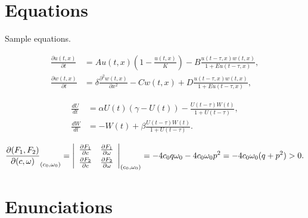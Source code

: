 \documentclass[preprint]{ptephy_v1}%
\begin{document}
\section{Equations}

Sample equations.

\begin{equation}\label{1.1}
\begin{split}
\frac{\partial u(t,x)}{\partial t} &= Au(t,x) \left(1-\frac{u(t,x)}{K}\right)-B\frac{u(t-\tau,x) w(t,x)}{1+Eu(t-\tau,x)},\\
\frac{\partial w(t,x)}{\partial t} &=\delta \frac{\partial^2w(t,x)}{\partial x^2}-Cw(t,x)+D\frac{u(t-\tau,x)w(t,x)}{1+Eu(t-\tau,x)},
\end{split}
\end{equation}

\begin{equation}\label{1.2}
\begin{split}
\frac{dU}{dt} &=\alpha U(t)(\gamma -U(t))-\frac{U(t-\tau)W(t)}{1+U(t-\tau)},\\
\frac{dW}{dt} &=-W(t)+\beta\frac{U(t-\tau)W(t)}{1+U(t-\tau)}.
\end{split}
\end{equation}

\[
\frac{\partial(F_1,F_2)}{\partial(c,\omega)}_{(c_0,\omega_0)} = \left|
\begin{array}{ll}
\frac{\partial F_1}{\partial c} &\frac{\partial F_1}{\partial \omega} \\\noalign{\vskip3pt}
\frac{\partial F_2}{\partial c}&\frac{\partial F_2}{\partial \omega}
\end{array}\right|_{(c_0,\omega_0)}=-4c_0q\omega_0 -4c_0\omega_0p^2 =-4c_0\omega_0(q+p^2)>0.
\]

\section{Enunciations}



\end{document}
